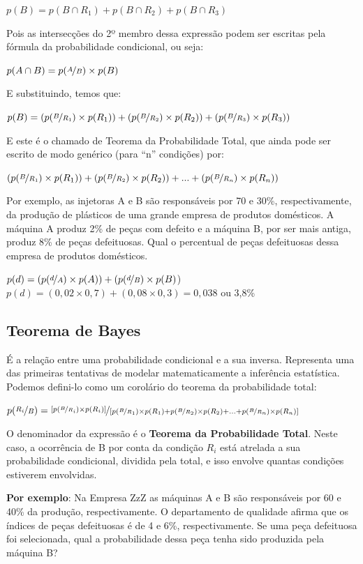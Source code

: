 \documentclass[a4paper,11pt]{article}
\begin{document}
$p(B) = p(B \cap R_1) + p(B \cap R_2) + p(B \cap R_3)$

Pois as intersecções do 2º membro dessa expressão podem ser escritas pela fórmula da probabilidade condicional, ou seja:

$p(A \cap B) = p(\nicefrac{A}{B}) \times p(B)$

E substituindo, temos que: 

$p(B) = (p(\nicefrac{B}{R_1}) \times p(R_1)) + (p(\nicefrac{B}{R_2}) \times p(R_2)) + (p(\nicefrac{B}{R_3}) \times p(R_3))$

E este é o chamado de Teorema da Probabilidade Total, que ainda pode ser escrito de modo genérico (para “n” condições) por:

$(p(\nicefrac{B}{R_1}) \times p(R_1)) + (p(\nicefrac{B}{R_2}) \times p(R_2)) + ... + (p(\nicefrac{B}{R_n}) \times p(R_n))$

Por exemplo, as injetoras A e B são responsáveis por 70 e 30\%, respectivamente, da produção de plásticos de uma grande empresa de produtos domésticos. A máquina A produz 2\% de peças com defeito e a máquina B, por ser mais antiga, produz 8\% de peças defeituosas. Qual o percentual de peças defeituosas dessa empresa de produtos domésticos.

$p(d) = (p(\nicefrac{d}{A}) \times p(A)) + (p(\nicefrac{d}{B}) \times p(B)$) \\
$p(d) = (0,02 \times 0,7) + (0,08 \times 0,3) = 0,038$ ou 3,8\%

\subsection{Teorema de Bayes}
É a relação entre uma probabilidade condicional e a sua inversa. Representa uma das primeiras tentativas de modelar matematicamente a inferência estatística. Podemos defini-lo como um corolário do teorema da probabilidade total:

$p( \nicefrac{R_i}{B} ) = \nicefrac{[p( \nicefrac{B}{R_i} ) \times p(R_i)]}{[p( \nicefrac{B}{R_1} ) \times p(R_1) + p( \nicefrac{B}{R_2} ) \times p(R_2) + ... + p( \nicefrac{B}{R_n} ) \times p(R_n)]}$

O denominador da expressão é o \textbf{Teorema da Probabilidade Total}. Neste caso, a ocorrência de B por conta da condição $R_{i}$ está atrelada a sua probabilidade condicional, dividida pela total, e isso envolve quantas condições estiverem envolvidas.

\textbf{Por exemplo}: Na Empresa ZzZ as máquinas A e B são responsáveis por 60 e 40\% da produção, respectivamente. O departamento de qualidade afirma que os índices de peças defeituosas é de 4 e 6\%, respectivamente. Se uma peça defeituosa foi selecionada, qual a probabilidade dessa peça tenha sido produzida pela máquina B?
\end{document}
